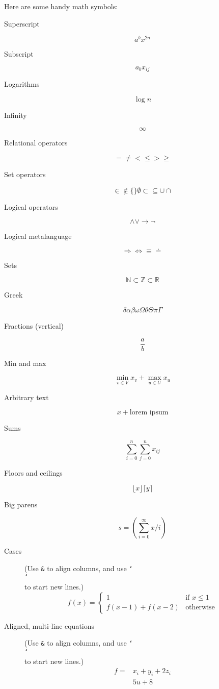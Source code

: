 \documentclass[11pt]{article}
\newcommand{\BACKSLASH}{\char`\\ }
\begin{document}
\begin{enumerate}
Here are some handy math symbols:
\begin{description}
  \item[Superscript]
    \[
      a^b x^{2n}
    \]
  \item[Subscript]
    \[
      a_b x_{ij}
    \]
  \item[Logarithms]
    \[
      \log n
    \]
  \item[Infinity]
    \[
      \infty
    \]
  \item[Relational operators]
    \[
      = \neq < \leq > \geq
    \]
  \item[Set operators]
    \[
      \in \notin \{ \} \emptyset \subset \subseteq \cup \cap
    \]
  \item[Logical operators]
    \[
      \wedge \vee \rightarrow \neg
    \]
  \item[Logical metalanguage]
    \[
      \Rightarrow \Leftrightarrow \equiv \doteq
    \]
  \item[Sets]
    \[
      \mathbb{N} \subset \mathbb{Z} \subset \mathbb{R}
    \]
  \item[Greek]
    \[
      \delta \alpha \beta \omega \Omega \theta \Theta \pi \Gamma
    \]
  \item[Fractions (vertical)]
    \[
      \frac{a}{b}
    \]
  \item[Min and max]
    \[
      \min_{v \in V} x_v + \max_{u \in U} x_u
    \]
  \item[Arbitrary text]
    \[
      x + \text{lorem ipsum}
    \]
  \item[Sums]
    \[
      \sum_{i = 0}^{n} \sum_{j = 0}^{n} x_{ij}
    \]
  \item[Floors and ceilings]
    \[
      \lfloor x \rfloor \lceil y \rceil
    \]
  \item[Big parens]
    \[
      s = \left( \sum_{i = 0}^{\infty} x/i \right)
    \]
  \item[Cases]
    (Use \texttt{\&} to align columns, and use \texttt{\BACKSLASH \BACKSLASH} to
    start new lines.)
    \[
      f(x) = \begin{cases}
        1                     & \text{if } x \leq 1\\
        f(x - 1) + f(x - 2)   & \text{otherwise}
      \end{cases}
    \]
  \item[Aligned, multi-line equations]
    (Use \texttt{\&} to align columns, and use \texttt{\BACKSLASH \BACKSLASH} to
    start new lines.)
    \[
      \begin{aligned}
        f = & x_i + y_i + 2z_i \\
            & 5u + 8
      \end{aligned}
    \]
\end{description}


\end{enumerate}
\end{document}
